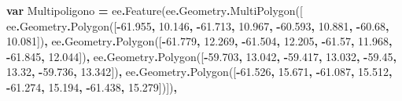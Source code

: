 \documentclass[
  12pt,
  letterpaper,
  twoside]{book}
\newenvironment{Shaded}{\begin{snugshade}}{\end{snugshade}}
\newcommand{\AttributeTok}[1]{\textcolor[rgb]{0.77,0.63,0.00}{#1}}
\newcommand{\FloatTok}[1]{\textcolor[rgb]{0.00,0.00,0.81}{#1}}
\newcommand{\FunctionTok}[1]{\textcolor[rgb]{0.00,0.00,0.00}{#1}}
\newcommand{\KeywordTok}[1]{\textcolor[rgb]{0.13,0.29,0.53}{\textbf{#1}}}
\newcommand{\NormalTok}[1]{#1}
\newcommand{\OperatorTok}[1]{\textcolor[rgb]{0.81,0.36,0.00}{\textbf{#1}}}
\begin{document}
\begin{Shaded}
\begin{Highlighting}[]
\KeywordTok{var}\NormalTok{ Multipoligono }\OperatorTok{=}\NormalTok{ ee}\OperatorTok{.}\FunctionTok{Feature}\NormalTok{(ee}\OperatorTok{.}\AttributeTok{Geometry}\OperatorTok{.}\FunctionTok{MultiPolygon}\NormalTok{([}
\NormalTok{                ee}\OperatorTok{.}\AttributeTok{Geometry}\OperatorTok{.}\FunctionTok{Polygon}\NormalTok{([}\OperatorTok{{-}}\FloatTok{61.955}\OperatorTok{,} \FloatTok{10.146}\OperatorTok{,}         
                                        \OperatorTok{{-}}\FloatTok{61.713}\OperatorTok{,} \FloatTok{10.967}\OperatorTok{,}
                                        \OperatorTok{{-}}\FloatTok{60.593}\OperatorTok{,} \FloatTok{10.881}\OperatorTok{,}
                                           \OperatorTok{{-}}\FloatTok{60.68}\OperatorTok{,} \FloatTok{10.081}\NormalTok{])}\OperatorTok{,}
\NormalTok{                            ee}\OperatorTok{.}\AttributeTok{Geometry}\OperatorTok{.}\FunctionTok{Polygon}\NormalTok{([}\OperatorTok{{-}}\FloatTok{61.779}\OperatorTok{,} \FloatTok{12.269}\OperatorTok{,}     
                                       \OperatorTok{{-}}\FloatTok{61.504}\OperatorTok{,} \FloatTok{12.205}\OperatorTok{,}
                                       \OperatorTok{{-}}\FloatTok{61.57}\OperatorTok{,} \FloatTok{11.968}\OperatorTok{,}
                                       \OperatorTok{{-}}\FloatTok{61.845}\OperatorTok{,} \FloatTok{12.044}\NormalTok{])}\OperatorTok{,}
\NormalTok{                            ee}\OperatorTok{.}\AttributeTok{Geometry}\OperatorTok{.}\FunctionTok{Polygon}\NormalTok{([}\OperatorTok{{-}}\FloatTok{59.703}\OperatorTok{,} \FloatTok{13.042}\OperatorTok{,}         
                                       \OperatorTok{{-}}\FloatTok{59.417}\OperatorTok{,} \FloatTok{13.032}\OperatorTok{,}
                                       \OperatorTok{{-}}\FloatTok{59.45}\OperatorTok{,} \FloatTok{13.32}\OperatorTok{,}
                                       \OperatorTok{{-}}\FloatTok{59.736}\OperatorTok{,} \FloatTok{13.342}\NormalTok{])}\OperatorTok{,}
\NormalTok{                            ee}\OperatorTok{.}\AttributeTok{Geometry}\OperatorTok{.}\FunctionTok{Polygon}\NormalTok{([}\OperatorTok{{-}}\FloatTok{61.526}\OperatorTok{,} \FloatTok{15.671}\OperatorTok{,}          
                                       \OperatorTok{{-}}\FloatTok{61.087}\OperatorTok{,} \FloatTok{15.512}\OperatorTok{,}
                                       \OperatorTok{{-}}\FloatTok{61.274}\OperatorTok{,} \FloatTok{15.194}\OperatorTok{,}
                                       \OperatorTok{{-}}\FloatTok{61.438}\OperatorTok{,} \FloatTok{15.279}\NormalTok{])])}\OperatorTok{,}

\end{Highlighting}
\end{Shaded}
\end{document}
